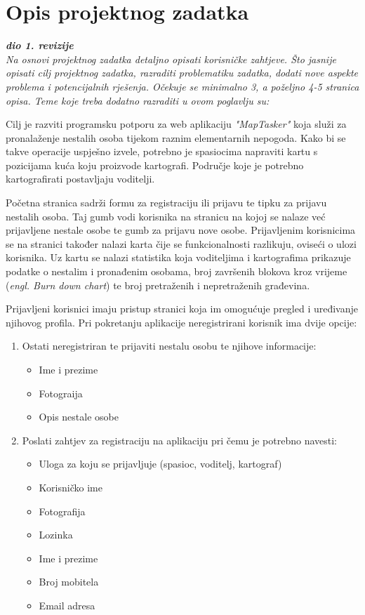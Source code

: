 \chapter{Opis projektnog zadatka}
		\textbf{\textit{dio 1. revizije}}\\
		
		\textit{Na osnovi projektnog zadatka detaljno opisati korisničke zahtjeve. Što jasnije opisati cilj projektnog zadatka, razraditi problematiku zadatka, dodati nove aspekte problema i potencijalnih rješenja. Očekuje se minimalno 3, a poželjno 4-5 stranica opisa.	Teme koje treba dodatno razraditi u ovom poglavlju su:}
			\par
			Cilj je razviti programsku potporu za web aplikaciju \textit{"MapTasker"} koja služi za pronalaženje nestalih osoba tijekom raznim elementarnih nepogoda. Kako bi se takve operacije uspješno izvele, potrebno je spasiocima napraviti kartu s pozicijama kuća koju proizvode kartografi. Područje koje je potrebno kartografirati postavljaju voditelji.
			
			Početna stranica sadrži formu za registraciju ili prijavu te tipku za prijavu nestalih osoba. Taj gumb vodi korisnika na stranicu na kojoj se nalaze već prijavljene nestale osobe te gumb za prijavu nove osobe. Prijavljenim korisnicima se na stranici također nalazi karta čije se funkcionalnosti razlikuju, oviseći o ulozi korisnika. Uz kartu se nalazi statistika koja voditeljima i kartografima prikazuje podatke o nestalim i pronađenim osobama, broj završenih blokova kroz vrijeme (\textit{engl. Burn down chart}) te broj pretraženih i nepretraženih građevina.
			
			Prijavljeni korisnici imaju pristup stranici koja im omogućuje pregled i uređivanje njihovog profila.
			Pri pokretanju aplikacije neregistrirani korisnik ima dvije opcije:
			\begin{enumerate}
				\item Ostati neregistriran te prijaviti nestalu osobu te njihove informacije:
				\begin{itemize}
					\item Ime i prezime
					\item Fotograija
					\item Opis nestale osobe
				\end{itemize}
				\item Poslati zahtjev za registraciju na aplikaciju pri čemu je potrebno navesti:
				\begin{itemize}
					\item Uloga za koju se prijavljuje (spasioc, voditelj, kartograf)
					\item Korisničko ime
					\item Fotografija
					\item Lozinka
					\item Ime i prezime
					\item Broj mobitela
					\item Email adresa
				\end{itemize}
			\end{enumerate}
			
